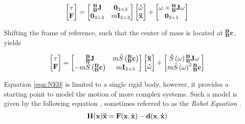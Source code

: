 \begin{align}
    \begin{bmatrix}
    \tau \\ {\mathbf{F}}
    \end{bmatrix} = 
    \begin{bmatrix}
     {^\mathbf{B}_\mathbf{B}\mathbf{J}} & {\mathbf{0}}_{3 \times 3} \\
      {\mathbf{0}}_{3 \times 3} & m {\mathbf{I}}_{3 \times 3}
    \end{bmatrix}
    \begin{bmatrix}
     \mathbf{\dot{\omega}}\\
     {\mathbf{\Ddot{x}}}
    \end{bmatrix}
    + 
    \begin{bmatrix}
     \omega \times {^\mathbf{B}_\mathbf{B}\mathbf{J}}\omega\\
     {\mathbf{0}}_{3 \times 1} 
    \end{bmatrix}
\end{align}

\noindent Shifting the frame of reference, such that the center of mass is located at $^\mathbf{B}_\mathbf{B} \mathbf{c}$, yields

\begin{align} \label{eqn:NE0}
    \begin{bmatrix}
    \tau \\ {\mathbf{F}}
    \end{bmatrix} = 
    \begin{bmatrix}
     {^\mathbf{B}_\mathbf{B}\mathbf{J}} & m\mathring{S}\left(^\mathbf{B}_\mathbf{B}\mathbf{c}\right) \\
      -m\mathring{S}\left(^\mathbf{B}_\mathbf{B}\mathbf{c}\right) & m {\mathbf{I}}_{3 \times 3}
    \end{bmatrix}
    \begin{bmatrix}
     {\mathbf{\Ddot{x}}}\\
     \mathbf{\dot{\omega}}
    \end{bmatrix}
    + 
    \begin{bmatrix}
     \mathring{S}\left(\omega\right){^\mathbf{B}_\mathbf{B}\mathbf{J}}\omega \\
     m \mathring{S}\left(\omega\right)^2{^\mathbf{B}_\mathbf{B}\mathbf{c}}
    \end{bmatrix}
\end{align}


\noindent Equation \ref{eqn:NE0} is limited to a single rigid body, however, it provides a starting point to model the motion of more complex systems. Such a model is given by the following equation \Cite{asada_slotine_1986, tedrake}, sometimes referred to as the \textit{Robot Equation} \Cite{isenberg_2020}.
\begin{align} \label{eqn:NE1}
    {\mathbf{H}}({\mathbf{{x}}}){\mathbf{\Ddot{x}}} = {\mathbf{F}}({\mathbf{{x}}}, {\mathbf{\dot{x}}}) - {\mathbf{d}}({\mathbf{{x}}}, {\mathbf{\dot{x}}})
\end{align}

